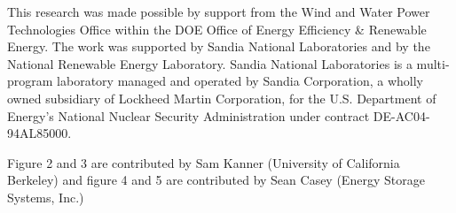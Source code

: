 \documentclass[twocolumn,10pt]{asme2e}
\begin{document}
\begin{acknowledgment}

This research was made possible by support from the Wind and Water Power Technologies Office within the DOE Office of Energy Efficiency \& Renewable Energy. The work was supported by Sandia National Laboratories and by the National Renewable Energy Laboratory. Sandia National Laboratories is a multi-program laboratory managed and operated by Sandia Corporation, a wholly owned subsidiary of Lockheed Martin Corporation, for the U.S. Department of Energy’s National Nuclear Security Administration under contract DE-AC04-94AL85000.

Figure 2 and 3 are contributed by Sam Kanner (University of California Berkeley) and figure 4 and 5 are contributed by Sean Casey (Energy Storage Systems, Inc.)

\end{acknowledgment}




%


\end{document}
